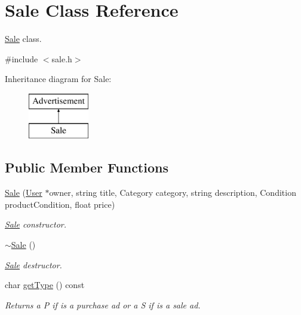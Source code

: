 \hypertarget{class_sale}{}\section{Sale Class Reference}
\label{class_sale}


\hyperlink{class_sale}{Sale} class.  




{\ttfamily \#include $<$sale.\+h$>$}

Inheritance diagram for Sale\+:\begin{figure}[H]
\begin{center}
\leavevmode
\includegraphics[height=2.000000cm]{class_sale}
\end{center}
\end{figure}
\subsection*{Public Member Functions}
\begin{DoxyCompactItemize}
\item 
\hyperlink{class_sale_ac8ff8ff1ab16deb6f12f1b3e63fcb310}{Sale} (\hyperlink{class_user}{User} $\ast$owner, string title, Category category, string description, Condition product\+Condition, float price)
\begin{DoxyCompactList}\small\item\em \hyperlink{class_sale}{Sale} constructor. \end{DoxyCompactList}\item 
\hypertarget{class_sale_ab6cb58a5d618fc4e4988b55342f21b21}{}\hyperlink{class_sale_ab6cb58a5d618fc4e4988b55342f21b21}{$\sim$\+Sale} ()\label{class_sale_ab6cb58a5d618fc4e4988b55342f21b21}

\begin{DoxyCompactList}\small\item\em \hyperlink{class_sale}{Sale} destructor. \end{DoxyCompactList}\item 
char \hyperlink{class_sale_ae105e16c4b41870d375c5b1442dc7031}{get\+Type} () const 
\begin{DoxyCompactList}\small\item\em Returns a P if is a purchase ad or a S if is a sale ad. \end{DoxyCompactList}\end{DoxyCompactItemize}
